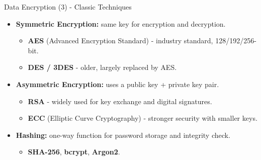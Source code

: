 \begin{frame}{Data Encryption (3) - Classic Techniques}
    \Large
    
    \begin{itemize}
        
        \item \textbf{Symmetric Encryption:} same key for encryption and decryption.
        \begin{itemize}
            \large
            \setlength{\itemsep}{0.1cm}
            \item \textbf{AES} (Advanced Encryption Standard) - industry standard, 128/192/256-bit.
            \item \textbf{DES / 3DES} - older, largely replaced by AES.
        \end{itemize}
        
        \vspace{0.2cm}
        
        \item \textbf{Asymmetric Encryption:} uses a public key + private key pair.
        \begin{itemize}
            \large
            \setlength{\itemsep}{0.1cm}
            \item \textbf{RSA} - widely used for key exchange and digital signatures.
            \item \textbf{ECC} (Elliptic Curve Cryptography) - stronger security with smaller keys.
        \end{itemize}
        
        \vspace{0.2cm}
        
        \item \textbf{Hashing:} one-way function for password storage and integrity check.
        \begin{itemize}
            \large
            \item \textbf{SHA-256}, \textbf{bcrypt}, \textbf{Argon2}.
        \end{itemize}
    \end{itemize}
\end{frame}

